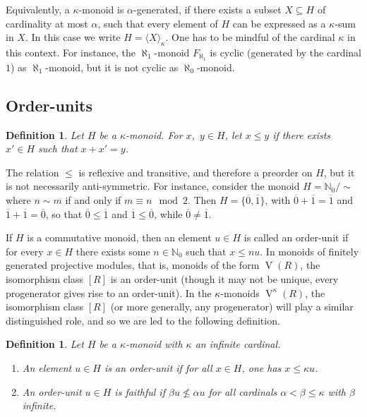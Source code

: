 \documentclass[a4paper,11pt,oneside]{amsart}
\newtheorem{defi}[teor]{Definition}
\theoremstyle{remark}
\newcommand{\defit}[1]{\textsf{#1}}
\newcommand{\bN}{\mathbb N}
\DeclareMathOperator{\Vmon}{V}
\begin{document}
Equivalently, a $\kappa$-monoid is $\alpha$-generated, if there exists a subset $X \subseteq H$ of cardinality at most $\alpha$, such that every element of $H$ can be expressed as a $\kappa$-sum in $X$.
In this case we write $H = \langle X \rangle_\kappa$.
One has to be mindful of the cardinal $\kappa$ in this context.
For instance, the $\aleph_1$-monoid $F_{\aleph_1}$ is cyclic (generated by the cardinal $1$) as $\aleph_1$-monoid, but it is not cyclic as $\aleph_0$-monoid.

\subsection{Order-units}

\begin{defi}
  Let $H$ be a $\kappa$-monoid.
  For $x$,~$y \in H$, let $x \le y$ if there exists $x' \in H$ such that $x+x'=y$.
\end{defi}

The relation $\le$ is reflexive and transitive, and therefore a preorder on $H$, but it is not necessarily anti-symmetric.
For instance, consider the monoid $H=\bN_0/\!\sim$ where $n \sim m$ if and only if $m \equiv n \mod 2$. Then $H = \{ \overline 0, \overline 1\}$, with $\overline 0 + \overline 1 = \overline 1$ and $\overline 1 + \overline 1 = \overline 0$, so that $\overline 0 \le \overline 1$ and $\overline 1 \le \overline 0$, while $\overline 0 \ne \overline 1$.

If $H$ is a commutative monoid, then an element $u \in H$ is called an \defit{order-unit} if for every $x \in H$ there exists some $n \in \bN_0$ such that $x \le nu$.
In monoids of finitely generated projective modules, that is, monoids of the form $\Vmon(R)$, the isomorphism class $[R]$ is an order-unit (though it may not be unique, every progenerator gives rise to an order-unit).
In the $\kappa$-monoids $\Vmon^\kappa(R)$, the isomorphism class $[R]$ (or more generally, any progenerator) will play a similar distinguished role, and so we are led to the following definition.

\begin{defi}
  Let $H$ be a $\kappa$-monoid with $\kappa$ an infinite cardinal.
  \begin{enumerate}
  \item An element $u \in H$ is an \defit{order-unit} if for all $x \in H$, one has $x \le \kappa u$.
  \item An order-unit $u \in H$ is \defit{faithful} if $\beta u \not\le \alpha u$ for all cardinals $\alpha < \beta \le \kappa$ with $\beta$ infinite.
  \end{enumerate}
\end{defi}
\end{document}
